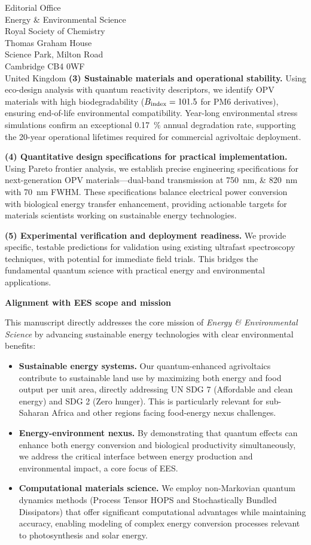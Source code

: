 \documentclass[11pt]{letter}
\begin{document}
\begin{letter}{Editorial Office\\
Energy \& Environmental Science\\
Royal Society of Chemistry\\
Thomas Graham House\\
Science Park, Milton Road\\
Cambridge CB4 0WF\\
United Kingdom}
\textbf{(3) Sustainable materials and operational stability.} Using eco-design analysis with quantum reactivity descriptors, we identify OPV materials with high biodegradability ($B_{\rm index} = 101.5$ for PM6 derivatives), ensuring end-of-life environmental compatibility. Year-long environmental stress simulations confirm an exceptional \SI{0.17}{\percent} annual degradation rate, supporting the 20-year operational lifetimes required for commercial agrivoltaic deployment.

\textbf{(4) Quantitative design specifications for practical implementation.} Using Pareto frontier analysis, we establish precise engineering specifications for next-generation OPV materials—dual-band transmission at \SIlist{750;820}{\nano\meter} with \SI{70}{\nano\meter} FWHM. These specifications balance electrical power conversion with biological energy transfer enhancement, providing actionable targets for materials scientists working on sustainable energy technologies.

\textbf{(5) Experimental verification and deployment readiness.} We provide specific, testable predictions for validation using existing ultrafast spectroscopy techniques, with potential for immediate field trials. This bridges the fundamental quantum science with practical energy and environmental applications.

\textbf{Alignment with EES scope and mission}

This manuscript directly addresses the core mission of \textit{Energy \& Environmental Science} by advancing sustainable energy technologies with clear environmental benefits:
\begin{itemize}
    \item \textbf{Sustainable energy systems.} Our quantum-enhanced agrivoltaics contribute to sustainable land use by maximizing both energy and food output per unit area, directly addressing UN SDG 7 (Affordable and clean energy) and SDG 2 (Zero hunger). This is particularly relevant for sub-Saharan Africa and other regions facing food-energy nexus challenges.
    
    \item \textbf{Energy-environment nexus.} By demonstrating that quantum effects can enhance both energy conversion and biological productivity simultaneously, we address the critical interface between energy production and environmental impact, a core focus of EES.
    
    \item \textbf{Computational materials science.} We employ non-Markovian quantum dynamics methods (Process Tensor HOPS and Stochastically Bundled Dissipators) that offer significant computational advantages while maintaining accuracy, enabling modeling of complex energy conversion processes relevant to photosynthesis and solar energy.
    

\end{itemize}
\end{letter}
\end{document}
